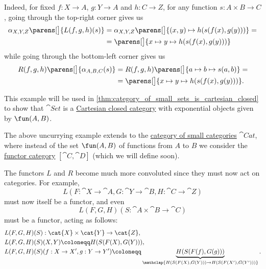 \begin{example}
\begin{thmenum}
    Indeed, for fixed \( f: X \to A \), \( g: Y \to A \) and \( h: C \to Z \), for any function \( s: A \times B \to C \), going through the top-right corner gives us
    \begin{align*}
      \alpha_{X,Y,Z}\parens[\big]{ L(f, g, h)(s) }
      &=
      \alpha_{X,Y,Z}\parens[\big]{ (x, y) \mapsto h(s(f(x), g(y))) }
      = \\ &=
      \parens[\big]{ x \mapsto y \mapsto h(s(f(x), g(y))) }
    \end{align*}
    while going through the bottom-left corner gives us
    \begin{align*}
      R(f, g, h)\parens[\big]{ \alpha_{A,B,C}(s) }
      &=
      R(f, g, h)\parens[\big]{ a \mapsto b \mapsto s(a, b) }
      = \\ &=
      \parens[\big]{ x \mapsto y \mapsto h(s(f(x), g(y))) }.
    \end{align*}

    This example will be used in \cref{thm:category_of_small_sets_is_cartesian_closed} to show that \( \cat{Set} \) is a \hyperref[def:cartesian_closed_category]{Cartesian closed category} with exponential objects given by \( \fun(A, B) \).

     The above uncurrying example extends to the \hyperref[def:category_of_small_categories]{category of small categories} \( \cat{Cat} \), where instead of the set \( \fun(A, B) \) of functions from \( A \) to \( B \) we consider the \hyperref[def:functor]{functor category} \( [\cat{C}, \cat{D}] \) (which we will define soon).

    The functors \( L \) and \( R \) become much more convoluted since they must now act on categories. For example,
    \begin{equation*}
      L(F: \cat{X} \to \cat{A}, G: \cat{Y} \to \cat{B}, H: \cat{C} \to \cat{Z})
    \end{equation*}
    must now itself be a functor, and even
    \begin{equation*}
      L(F, G, H)(S: \cat{A} \times \cat{B} \to \cat{C})
    \end{equation*}
    must be a functor, acting as follows:
    \begin{equation*}
      \begin{aligned}
        &L(F, G, H)(S): \cat{X} \times \cat{Y} \to \cat{Z}, \\
        &L(F, G, H)(S)(X, Y) \coloneqq H(S(F(X), G(Y))), \\
        &L(F, G, H)(S)(f: X \to X', g: Y \to Y') \coloneqq \underbrace{H(S(F(f), G(g)))}_{\mathclap{H(S(F(X), G(Y))) \to H(S(F(X'), G(Y')))}}.
      \end{aligned}
    \end{equation*}


\end{thmenum}
\end{example}
